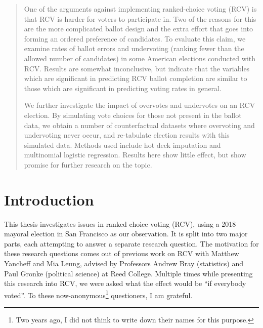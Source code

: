 \documentclass[12pt,twoside]{reedthesis}
\begin{document}
  \hypersetup{linkcolor=black}
  \setcounter{tocdepth}{1}
  \tableofcontents

  \listoftables

  \listoffigures
  \begin{abstract}
    One of the arguments against implementing ranked-choice voting (RCV) is that RCV is harder for voters to participate in. Two of the reasons for this are the more complicated ballot design and the extra effort that goes into forming an ordered preference of candidates. To evaluate this claim, we examine rates of ballot errors and undervoting (ranking fewer than the allowed number of candidates) in some American elections conducted with RCV. Results are somewhat inconclusive, but indicate that the variables which are significant in predicting RCV ballot completion are similar to those which are significant in predicting voting rates in general.
    
    \par
    
    We further investigate the impact of overvotes and undervotes on an RCV election. By simulating vote choices for those not present in the ballot data, we obtain a number of counterfactual datasets where overvoting and undervoting never occur, and re-tabulate election results with this simulated data. Methods used include hot deck imputation and multinomial logistic regression. Results here show little effect, but show promise for further research on the topic.
  \end{abstract}

\mainmatter %
\pagestyle{fancyplain} %

\hypertarget{introduction}{%
\chapter*{Introduction}\label{introduction}}

This thesis investigates issues in ranked choice voting (RCV), using a 2018 mayoral election in San Francisco as our observation. It is split into two major parts, each attempting to answer a separate research question. The motivation for these research questions comes out of previous work on RCV with Matthew Yancheff and Mia Leung, advised by Professors Andrew Bray (statistics) and Paul Gronke (political science) at Reed College. Multiple times while presenting this research into RCV, we were asked what the effect would be ``if everybody voted''. To these now-anonymous\footnote{Two years ago, I did not think to write down their names for this purpose.} questioners, I am grateful.
\end{document}
